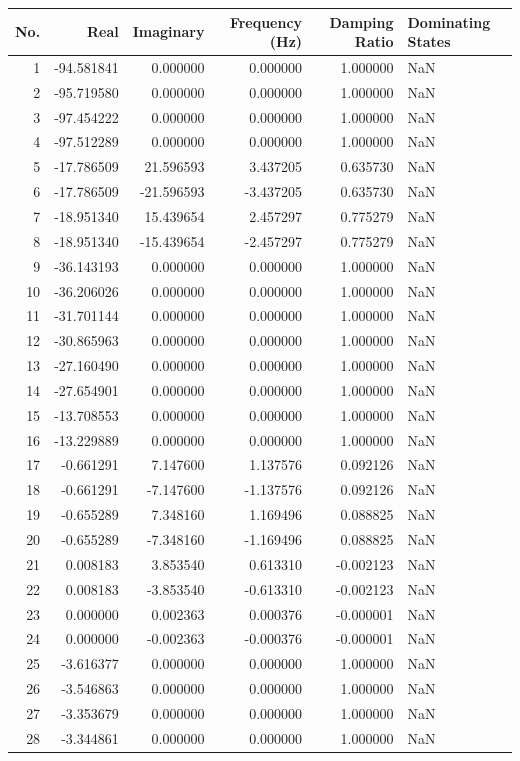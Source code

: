 \begin{tabular}{rrrrrl}
\toprule
No. & Real & Imaginary & Frequency (Hz) & Damping Ratio & Dominating States \\
\midrule
1 & -94.581841 & 0.000000 & 0.000000 & 1.000000 & NaN \\
2 & -95.719580 & 0.000000 & 0.000000 & 1.000000 & NaN \\
3 & -97.454222 & 0.000000 & 0.000000 & 1.000000 & NaN \\
4 & -97.512289 & 0.000000 & 0.000000 & 1.000000 & NaN \\
5 & -17.786509 & 21.596593 & 3.437205 & 0.635730 & NaN \\
6 & -17.786509 & -21.596593 & -3.437205 & 0.635730 & NaN \\
7 & -18.951340 & 15.439654 & 2.457297 & 0.775279 & NaN \\
8 & -18.951340 & -15.439654 & -2.457297 & 0.775279 & NaN \\
9 & -36.143193 & 0.000000 & 0.000000 & 1.000000 & NaN \\
10 & -36.206026 & 0.000000 & 0.000000 & 1.000000 & NaN \\
11 & -31.701144 & 0.000000 & 0.000000 & 1.000000 & NaN \\
12 & -30.865963 & 0.000000 & 0.000000 & 1.000000 & NaN \\
13 & -27.160490 & 0.000000 & 0.000000 & 1.000000 & NaN \\
14 & -27.654901 & 0.000000 & 0.000000 & 1.000000 & NaN \\
15 & -13.708553 & 0.000000 & 0.000000 & 1.000000 & NaN \\
16 & -13.229889 & 0.000000 & 0.000000 & 1.000000 & NaN \\
17 & -0.661291 & 7.147600 & 1.137576 & 0.092126 & NaN \\
18 & -0.661291 & -7.147600 & -1.137576 & 0.092126 & NaN \\
19 & -0.655289 & 7.348160 & 1.169496 & 0.088825 & NaN \\
20 & -0.655289 & -7.348160 & -1.169496 & 0.088825 & NaN \\
21 & 0.008183 & 3.853540 & 0.613310 & -0.002123 & NaN \\
22 & 0.008183 & -3.853540 & -0.613310 & -0.002123 & NaN \\
23 & 0.000000 & 0.002363 & 0.000376 & -0.000001 & NaN \\
24 & 0.000000 & -0.002363 & -0.000376 & -0.000001 & NaN \\
25 & -3.616377 & 0.000000 & 0.000000 & 1.000000 & NaN \\
26 & -3.546863 & 0.000000 & 0.000000 & 1.000000 & NaN \\
27 & -3.353679 & 0.000000 & 0.000000 & 1.000000 & NaN \\
28 & -3.344861 & 0.000000 & 0.000000 & 1.000000 & NaN \\
\bottomrule
\end{tabular}
